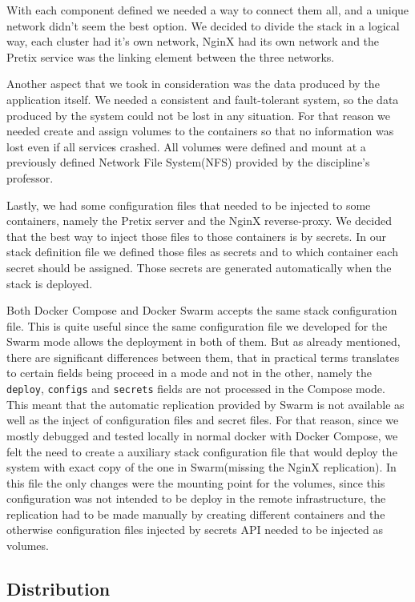 \documentclass[12pt]{article}
\begin{document}
With each component defined we needed a way to connect them all, and a unique network didn't seem the best option. We decided to divide the stack in a logical way, each cluster had it's own network, NginX had its own network and the Pretix service was the linking element between the three networks.

Another aspect that we took in consideration was the data produced by the application itself. We needed a consistent and fault-tolerant system, so the data produced by the system could not be lost in any situation. For that reason we needed create and assign volumes to the containers so that no information was lost even if all services crashed. All volumes were defined and mount at a previously defined Network File System(NFS) provided by the discipline's professor.

Lastly, we had some configuration files that needed to be injected to some containers, namely the Pretix server and the NginX reverse-proxy. We decided that the best way to inject those files to those containers is by secrets. In our stack definition file we defined those files as secrets and to which container each secret should be assigned. Those secrets are generated automatically when the stack is deployed. 

Both Docker Compose and Docker Swarm accepts the same stack configuration file. This is quite useful since the same configuration file we developed for the Swarm mode allows the deployment in both of them. But as already mentioned, there are significant differences between them, that in practical terms translates to certain fields being proceed in a mode and not in the other, namely the \texttt{deploy}, \texttt{configs} and \texttt{secrets} fields are not processed in the Compose mode. This meant that the automatic replication provided by Swarm is not available as well as the inject of configuration files and secret files. For that reason, since we mostly debugged and tested locally in normal docker with Docker Compose, we felt the need to create a auxiliary stack configuration file that would deploy the system with exact copy of the one in Swarm(missing the NginX replication). In this file the only changes were the mounting point for the volumes, since this configuration was not intended to be deploy in the remote infrastructure, the replication had to be made manually by creating different containers and the otherwise configuration files injected by secrets API needed to be injected as volumes.

\subsection{Distribution} \label{strategy.distribution} %
\end{document}
